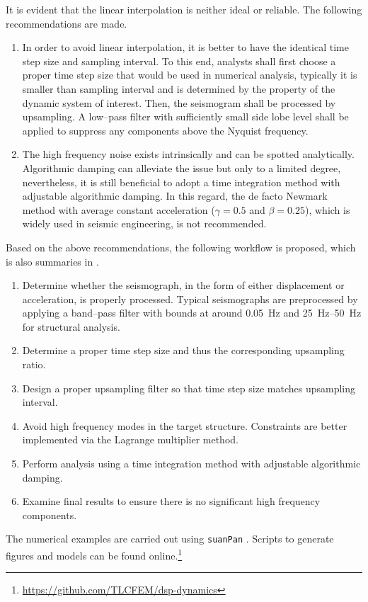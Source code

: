 It is evident that the linear interpolation is neither ideal or reliable. The following recommendations are made.
\begin{enumerate}
\item In order to avoid linear interpolation, it is better to have the identical time step size and sampling interval. To this end, analysts shall first choose a proper time step size that would be used in numerical analysis, typically it is smaller than sampling interval and is determined by the property of the dynamic system of interest. Then, the seismogram shall be processed by upsampling. A low--pass filter with sufficiently small side lobe level shall be applied to suppress any components above the Nyquist frequency.
\item The high frequency noise exists intrinsically and can be spotted analytically. Algorithmic damping can alleviate the issue but only to a limited degree, nevertheless, it is still beneficial to adopt a time integration method with adjustable algorithmic damping. In this regard, the de facto Newmark method with average constant acceleration ($\gamma=0.5$ and $\beta=0.25$), which is widely used in seismic engineering, is not recommended.
\end{enumerate}

Based on the above recommendations, the following workflow is proposed, which is also summaries in .
\begin{enumerate}
\item Determine whether the seismograph, in the form of either displacement or acceleration, is properly processed. Typical seismographs are preprocessed by applying a band--pass filter with bounds at around \SI{0.05}{\hertz} and \SIrange{25}{50}{\hertz} for structural analysis.
\item Determine a proper time step size and thus the corresponding upsampling ratio.
\item Design a proper upsampling filter so that time step size matches upsampling interval.
\item Avoid high frequency modes in the target structure. Constraints are better implemented via the Lagrange multiplier method.
\item Perform analysis using a time integration method with adjustable algorithmic damping.
\item Examine final results to ensure there is no significant high frequency components.
\end{enumerate}

The numerical examples are carried out using \texttt{suanPan} \citep{Chang2022}. Scripts to generate figures and models can be found online.\footnote{\url{https://github.com/TLCFEM/dsp-dynamics}}